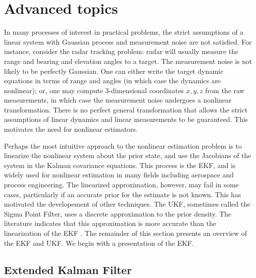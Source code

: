 \section{Advanced topics}

In many processes of interest in practical problems, the strict assumptions of a linear system with Gaussian process and measurement noise are not satisfied.
For instance, consider the radar tracking problem: radar will usually measure the range and bearing and elevation angles to a target.
The measurement noise is not likely to be perfectly Gaussian.
One can either write the target dynamic equations in terms of range and angles (in which case the dynamics are nonlinear); or, one may compute 3-dimensional coordinates $x,y,z$ from the raw measurements, in which case the measurement noise undergoes a nonlinear transformation.
There is no perfect general transformation that allows the strict assumptions of linear dynamics and linear measurements to be guaranteed. This motivates the need for nonlinear estimators.

Perhaps the most intuitive approach to the nonlinear estimation problem is to linearize the nonlinear system about the prior state, and use the Jacobians of the system in the Kalman covariance equations.
This process is the EKF, and is widely used for nonlinear estimation in many fields including aerospace and process engineering.
The linearized approximation, however, may fail in some cases, particularly if an accurate prior for the estimate is not known.
This has motivated the developement of other techniques.
The UKF, sometimes called the Sigma Point Filter, uses a discrete approximation to the prior density.
The literature indicates that this approximation is more accurate than the linearization of the EKF \cite{wan2000}.
The remainder of this section presents an overview of the EKF and UKF.
We begin with a presentation of the EKF.

\subsection{Extended Kalman Filter}

